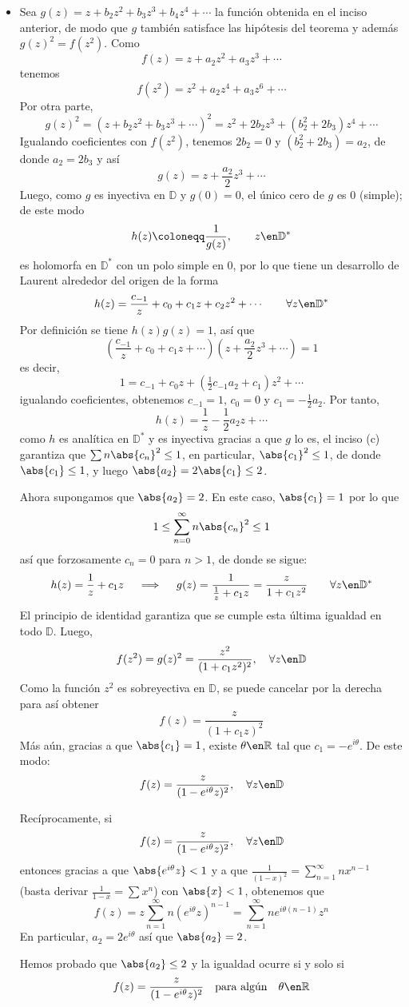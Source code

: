 \begin{sol}
\begin{itemize}[leftmargin=1.5em]
\item[(e)] 
Sea $g(z)=z+b_2z^2+b_3z^3+b_4z^4+\cdots$ la función obtenida en el inciso anterior, de modo que $g$ también satisface las hipótesis del teorema y además $g(z)^2=f(z^2)$. Como
\[
f(z)=z+a_2z^2+a_3z^3+\cdots
\]
tenemos
\[
f(z^2)=z^2+a_2z^4+a_3z^6+\cdots
\]
Por otra parte,
\[
g(z)^2
=
\left(z+b_2z^2+b_3z^3+\cdots\right)^2
=
z^2+2b_2z^3+(b_2^2+2b_3)z^4+\cdots
\]
Igualando coeficientes con $f(z^2)$, tenemos $2b_2=0$ y $(b_2^2+2b_3) = a_2$, de donde \(a_2 = 2b_3\) y así 
\[
g(z) = z + \frac{a_2}{2}z^3+\cdots
\]
Luego, como $g$ es inyectiva en $\mathbb D$ y $g(0)=0$, el único cero de $g$ es $0$ (simple); de este modo
\[
h(z)\coloneqq\frac{1}{g(z)},
\qquad z\en\mathbb{D}^*
\]
es holomorfa en $\mathbb D^*$ con un polo simple en $0$, por lo que tiene un desarrollo de Laurent alrededor del origen de la forma 
\[
h(z)=\frac{c_{-1}}{z}+c_0+c_1z+c_2z^2+\cdots
\qquad
\forall z\en\mathbb D^*
\]
Por definición se tiene $h(z)g(z)=1$, así que
\[
\left(\frac{c_{-1}}{z}+c_0+c_1z+\cdots\right)
\left(z + \frac{a_2}{2}z^3+\cdots\right)
= 1
\]
es decir,
\[
1=c_{-1} + c_0z + (\tfrac{1}{2}c_{-1}a_2+c_1)z^2 + \cdots
\]
igualando coeficientes, obtenemos $c_{-1} = 1$, $c_0=0$ y $c_1 = -\frac12a_2$. Por tanto, 
\[h(z) = \frac{1}{z}-\frac12a_2z+\cdots\]
como $h$ es analítica en $\mathbb D^*$ y es inyectiva gracias a que $g$ lo es, el inciso (c) garantiza que $\sum n\abs{c_n}^2 \leq 1$, en particular, $\abs{c_1}^2 \leq 1$, de donde $\abs{c_1} \leq 1$, y luego $\abs{a_2} = 2\abs{c_1} \leq 2$.\par
Ahora supongamos que $\abs{a_2} = 2$. En este caso, $\abs{c_1}=1$ por lo que
\[
1 \leq \sum^\infty_{n=0}n\abs{c_n}^2 \leq 1
\]
así que forzosamente $c_n=0$ para $n> 1$, de donde se sigue:
\[
h(z) = \frac{1}{z}+c_1z
\quad\implies\quad 
g(z) = \frac{1}{\frac{1}{z}+c_1z} = \frac{z}{1+c_1z^2}
\qquad\forall z\en\mathbb D^* 
\]
El principio de identidad garantiza que se cumple esta última igualdad en todo $\mathbb D$. Luego, 
\[
f(z^2) = g(z)^2 = \frac{z^2}{(1+c_1z^2)^2},
\quad\forall z\en\mathbb D
\]
Como la función $z^2$ es sobreyectiva en $\mathbb D$, se puede cancelar por la derecha para así obtener
\[
f(z) = \frac{z}{(1+c_1z)^2}
\]
Más aún, gracias a que $\abs{c_1} = 1$, existe $\theta \en \mathbb R$ tal que $c_1 = -e^{i\theta}$. De este modo:
\[
f(z) = \frac{z}{(1-e^{i\theta}z)^2},
\quad\forall z\en\mathbb D
\]

Recíprocamente, si
\[
f(z)=\frac{z}{(1-e^{i\theta}z)^2},
\quad\forall z\en\mathbb D
\]
entonces gracias a que $\abs{e^{i\theta}z} < 1$ y a que $\frac{1}{(1-x)^2} = \sum^\infty_{n=1}nx^{n-1}$ (basta derivar $\frac{1}{1-x} = \sum x^n$) con $\abs{x} <1$, obtenemos que
\[
f(z) = z\sum^\infty_{n=1}n(e^{i\theta}z)^{n-1} = \sum^\infty_{n=1}ne^{i\theta(n-1)} z^n
\]
En particular, $a_2 = 2e^{i\theta}$ así que $\abs{a_2} = 2$.\par\vspace{1em}
Hemos probado que $\abs{a_2}\le 2$
y la igualdad ocurre si y solo si
\[
f(z)=\frac{z}{(1-e^{i\theta}z)^2}
\quad\text{para algún}\quad
\theta\en\mathbb R
\]


\end{itemize}
\end{sol}
